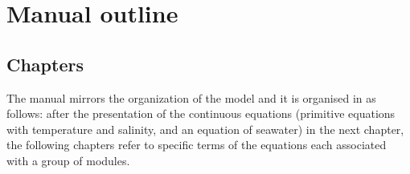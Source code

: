 \section*{Manual outline}

\subsection*{Chapters}

The manual mirrors the organization of the model and it is organised in as follows:
after the presentation of the continuous equations
(primitive equations with temperature and salinity, and an equation of seawater) in the next chapter,
the following chapters refer to specific terms of the equations each associated with
a group of modules.

